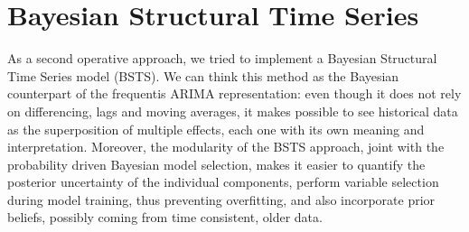 \documentclass[11pt,twoside]{report}
\begin{document}
\section{Bayesian Structural Time Series}
As a second operative approach, we tried to implement a Bayesian Structural Time Series model (BSTS). We can think this method as the Bayesian counterpart of the frequentis ARIMA representation: even though it does not rely on differencing, lags and moving averages, it makes possible to see historical data as the superposition of multiple effects, each one with its own meaning and interpretation. Moreover, the modularity of the BSTS approach, joint with the probability driven Bayesian model selection, makes it easier to quantify the posterior uncertainty of the individual components, perform variable
selection during model training, thus preventing overfitting, and also incorporate prior beliefs, possibly coming from time consistent, older data. 
\end{document}
